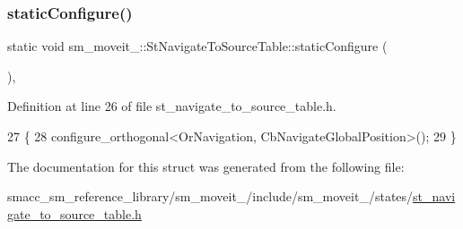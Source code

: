 \subsubsection{\texorpdfstring{static\+Configure()}{staticConfigure()}}
{\footnotesize\ttfamily static void sm\+\_\+moveit\+\_\+::\+St\+Navigate\+To\+Source\+Table\+::static\+Configure (\begin{DoxyParamCaption}{ }\end{DoxyParamCaption})\hspace{0.3cm}{\ttfamily [inline]}, {\ttfamily [static]}}



Definition at line 26 of file st\+\_\+navigate\+\_\+to\+\_\+source\+\_\+table.\+h.


\begin{DoxyCode}
27         \{
28             configure\_orthogonal<OrNavigation, CbNavigateGlobalPosition>();
29         \}
\end{DoxyCode}


The documentation for this struct was generated from the following file\+:\begin{DoxyCompactItemize}
\item 
smacc\+\_\+sm\+\_\+reference\+\_\+library/sm\+\_\+moveit\+\_/include/sm\+\_\+moveit\+\_/states/\hyperlink{st__navigate__to__source__table_8h}{st\+\_\+navigate\+\_\+to\+\_\+source\+\_\+table.\+h}\end{DoxyCompactItemize}

